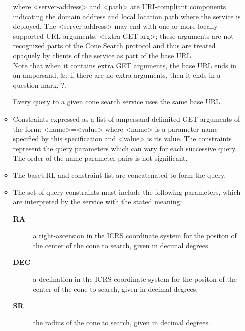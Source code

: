 \documentclass[11pt,a4paper]{ivoa}
\begin{document}
\begin{enumerate}
\begin{itemize}
		where <server-address> and <path> are URI-compliant components indicating the domain address and local location path where the service is deployed. The <server-address> may end with one or more locally supported URL arguments, <extra-GET-arg>; these arguments are not recognized parts of the Cone Search protocol and thus are treated opaquely by clients of the service as part of the base URL.\\
Note that when it contains extra GET arguments, the base URL ends in an ampersand, \&; if there are no extra arguments, then it ends in a question mark, ?.\\
		Every query to a given cone search service uses the same base URL.
		\item Constraints expressed as a list of ampersand-delimited GET arguments of the form: <name>=<value> where <name> is a parameter name specified by this specification and <value> is its value. The constraints represent the query parameters which can vary for each successive query. The order of the name-parameter pairs is not significant.
		\item The baseURL and constraint list are concatenated to form the query.
		\item The set of query constraints must include the following parameters, which are interpreted by the service with the stated meaning:
		\begin{description}
			\item[\textbf{RA}] a right-ascension in the ICRS coordinate system for the positon of the center of the cone to search, given in decimal degrees.
			\item[\textbf{DEC}] a declination in the ICRS coordinate system for the positon of the center of the cone to search, given in decimal degrees.
			\item[\textbf{SR}] the radius of the cone to search, given in decimal degrees.
		\end{description}

\end{itemize}
\end{enumerate}
\end{document}
